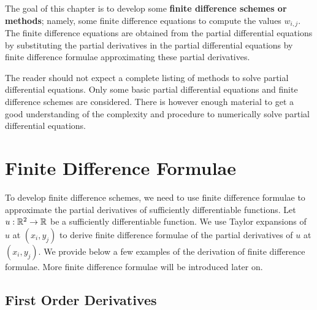 The goal of this chapter is to develop some
{\bfseries finite difference schemes or methods};
namely, some finite difference equations to compute the values
$w_{i,j}$.   The finite difference equations are obtained from the
partial differential equations by substituting the partial derivatives
in the partial differential equations by finite difference formulae
approximating these partial derivatives.

The reader should not expect a complete listing of methods to solve
partial differential equations.  Only some basic partial differential
equations and finite difference schemes are considered.  There is
however enough material to get a good understanding of the complexity
and procedure to numerically solve partial differential equations.

\section{Finite Difference Formulae}\label{Basicfdf}

To develop finite difference schemes, we need to use finite difference
formulae to approximate the partial derivatives of sufficiently
differentiable functions.  Let $u:\mathbb{R}^2 \to \mathbb{R}$ be a sufficiently
differentiable function.  We use Taylor expansions of $u$ 
at $(x_i,y_j)$ to derive finite difference formulae of the
partial derivatives of $u$ at $(x_i,y_j)$.  We provide below a few
examples of the derivation of finite difference formulae.  More
finite difference formulae will be introduced later on.

\subsection{First Order Derivatives}

